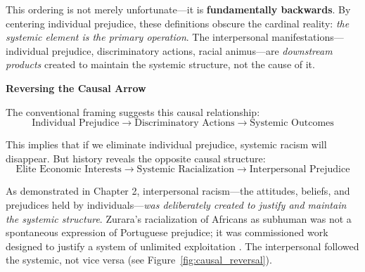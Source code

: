\documentclass[12pt,openany]{book}
\begin{document}
This ordering is not merely unfortunate---it is \textbf{fundamentally backwards}. By centering individual prejudice, these definitions obscure the cardinal reality: \textit{the systemic element is the primary operation}. The interpersonal manifestations---individual prejudice, discriminatory actions, racial animus---are \textit{downstream products} created to maintain the systemic structure, not the cause of it.

\textbf{Reversing the Causal Arrow}

The conventional framing suggests this causal relationship:
\[
\text{Individual Prejudice} \rightarrow \text{Discriminatory Actions} \rightarrow \text{Systemic Outcomes}
\]

This implies that if we eliminate individual prejudice, systemic racism will disappear. But history reveals the opposite causal structure:
\[
\text{Elite Economic Interests} \rightarrow \text{Systemic Racialization} \rightarrow \text{Interpersonal Prejudice}
\]

As demonstrated in Chapter 2, interpersonal racism---the attitudes, beliefs, and prejudices held by individuals---\textit{was deliberately created to justify and maintain the systemic structure}. Zurara's racialization of Africans as subhuman was not a spontaneous expression of Portuguese prejudice; it was commissioned work designed to justify a system of unlimited exploitation \cite{zurara, biewen}. The interpersonal followed the systemic, not vice versa (see Figure~\ref{fig:causal_reversal}).
\end{document}
